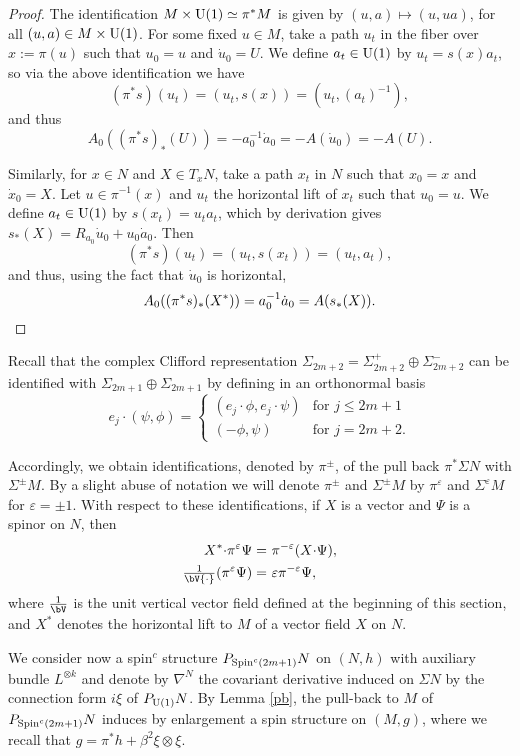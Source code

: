 \documentclass[12pt]{amsart}
\begin{document}
\begin{proof} The identification $M\times {{{\rm U}}(1)}\simeq \pi^*M$
is given by $(u,a)\mapsto (u,ua)$, for all $(u,a)\in M\times
{{{\rm U}}(1)}$. For some fixed $u\in M$, take a path $u_t$ in the
fiber over $x:=\pi(u)$ such that $u_0=u$ and $\dot{u}_0=U$. 
We define $a_t\in {{{\rm U}}(1)}$ by $u_t=s(x)a_t$, so via the above
identification we have  
$$(\pi^*s)(u_t)=(u_t,s(x))=(u_t,(a_t)^{-1}),$$
and thus 
$$A_0((\pi^*s)_*(U))=-a_0^{-1}\dot{a}_0=-A(\dot{u}_0)=-A(U).$$

Similarly, for $x\in N$ and $X\in T_x N$, take a path $x_t$ in $N$
such that $x_0=x$ and $\dot{x}_0=X$. Let $u\in\pi^{-1}(x)$ and $u_t$
the horizontal lift of $x_t$ such that $u_0=u$. We define $a_t\in
{{{\rm U}}(1)}$ by $s(x_t)=u_ta_t$, which by derivation gives
$s_*(X)=R_{a_0}\dot{u}_0+u_0\dot{a}_0$. Then 
$$(\pi^*s)(u_t)=(u_t,s(x_t))=(u_t,a_t),$$
and thus, using the fact that $\dot{u}_0$ is horizontal,
\[A_0((\pi^*s)_*(X^*))=a_0^{-1}\dot{a}_0=A(s_*(X)).\qedhere\]
\end{proof}

Recall that the complex Clifford representation $\Sigma_{2m+2}=
\Sigma ^+_{2m+2}\oplus\Sigma ^-_{2m+2}$ can be identified with
$\Sigma_{2m+1}\oplus\Sigma_{2m+1}$ by defining in an orthonormal basis
\[e_j\cdot(\psi,\phi)=
\begin{cases}
	(e_j\cdot\phi, e_j\cdot\psi) &  \text{for $j\le 2m+1$}\\
	(-\phi,\psi) & \text{for $j=2m+2$}.	
\end{cases}\]     
 
Accordingly, we obtain identifications, denoted by $\pi ^\pm$,
of the pull back 
$\pi^*\Sigma N$ with $\Sigma ^\pm M$. By a slight abuse of notation we will 
denote $\pi^\pm$ and $\Sigma ^\pm M$ by $\pi^{\varepsilon}$ and $\Sigma ^{\varepsilon} M$ for ${\varepsilon}=\pm1$. With respect
to these identifications, 
if $X$ is a vector  and ${\Psi}$ is a spinor on $N$, then  
\begin{align} 
\label{ps1}{{X^*}}{{\cdot}}\pi^{\varepsilon}{\Psi}=&\ \pi^{-{\varepsilon}}(X{{\cdot}}{\Psi}),\\
\label{ps2}\tfrac{1}\bV{{\cdot}}(\pi^{\varepsilon}{\Psi})=&\ {\varepsilon} \pi^{-{\varepsilon}} {\Psi}, 
\end{align}
where $\frac{1}\bV$ is the unit vertical vector field defined at the beginning
of this section, and ${{X^*}}$ denotes the horizontal lift 
to $M$ of a vector field $X$ on $N$.

We consider now a spin$^c$ structure ${P_{{{\rm Spin}}^c(2m+1)}N}$ on $(N,h)$ with
auxiliary bundle 
$L^{\otimes k}$ and denote by ${\nabla}^N$ the covariant derivative induced on
$\Sigma N$ by the connection form $i\xi$ of ${P_{{{\rm U}}(1)}N}$. By Lemma \ref{pb},
the pull-back to $M$ of ${P_{{{\rm Spin}}^c(2m+1)}N}$ 
induces by enlargement a spin structure on $(M,g)$, where we recall that
$g=\pi^*h+{\beta}^2\xi\otimes\xi$.   
\end{document}
